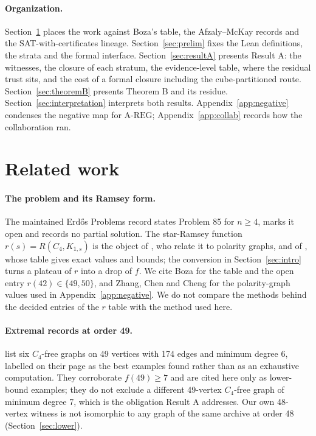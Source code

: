 \documentclass{anvil-paper}
\newcommand{\AREG}{\mathrm{A\text{-}REG}}
\theoremstyle{definition}
\begin{document}
\paragraph{Organization.} Section~\ref{sec:related} places the work against Boza's table, the Afzaly--McKay records and the SAT-with-certificates lineage. Section~\ref{sec:prelim} fixes the Lean definitions, the strata and the formal interface. Section~\ref{sec:resultA} presents Result A: the witnesses, the closure of each stratum, the evidence-level table, where the residual trust sits, and the cost of a formal closure including the cube-partitioned route. Section~\ref{sec:theoremB} presents Theorem B and its residue. Section~\ref{sec:interpretation} interprets both results. Appendix~\ref{app:negative} condenses the negative map for $\AREG$; Appendix~\ref{app:collab} records how the collaboration ran.

\section{Related work}\label{sec:related}

\paragraph{The problem and its Ramsey form.} The maintained Erdős Problems record \citep{bloom-erdos85} states Problem 85 for $n\ge 4$, marks it open and records no partial solution. The star-Ramsey function $r(s)=R(C_4,K_{1,s})$ is the object of \citet{zhang2017polarity}, who relate it to polarity graphs, and of \citet{boza2024ramsey}, whose table gives exact values and bounds; the conversion in Section~\ref{sec:intro} turns a plateau of $r$ into a drop of $f$. We cite Boza for the table and the open entry $r(42)\in\{49,50\}$, and Zhang, Chen and Cheng for the polarity-graph values used in Appendix~\ref{app:negative}. We do not compare the methods behind the decided entries of the $r$ table with the method used here.

\paragraph{Extremal records at order 49.} \citet{afzaly-mckay-extremal} list six $C_4$-free graphs on 49 vertices with 174 edges and minimum degree 6, labelled on their page as the best examples found rather than as an exhaustive computation. They corroborate $f(49)\ge 7$ and are cited here only as lower-bound examples; they do not exclude a different 49-vertex $C_4$-free graph of minimum degree 7, which is the obligation Result A addresses. Our own 48-vertex witness is not isomorphic to any graph of the same archive at order 48 (Section~\ref{sec:lower}).
\end{document}
